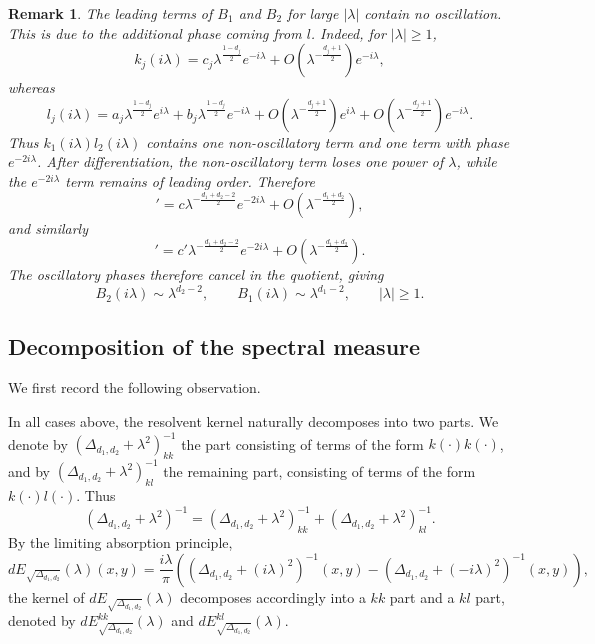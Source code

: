 \documentclass[12pt]{amsart}
\newcommand\Lapd{\Delta_{d_1, d_2}}
\newtheorem{remark}[theorem]{Remark}
\begin{document}
\begin{remark}
The leading terms of $B_1$ and $B_2$ for large $|\lambda|$ contain no
oscillation. This is due to the additional phase coming from $l$. Indeed, for
$|\lambda|\ge 1$,
\begin{equation*}
k_j(i\lambda)
=
c_j\lambda^{\frac{1-d_j}{2}}e^{-i\lambda}
+O\left(\lambda^{-\frac{d_j+1}{2}}\right)e^{-i\lambda},
\end{equation*}
whereas
\begin{equation*}
l_j(i\lambda)
=
a_j\lambda^{\frac{1-d_j}{2}}e^{i\lambda}
+b_j\lambda^{\frac{1-d_j}{2}}e^{-i\lambda}
+O\left(\lambda^{-\frac{d_j+1}{2}}\right)e^{i\lambda}
+O\left(\lambda^{-\frac{d_j+1}{2}}\right)e^{-i\lambda}.
\end{equation*}
Thus $k_1(i\lambda)l_2(i\lambda)$ contains one non-oscillatory term and one
term with phase $e^{-2i\lambda}$. After differentiation, the non-oscillatory
term loses one power of $\lambda$, while the $e^{-2i\lambda}$ term remains of
leading order. Therefore
\begin{equation*}
[k_1(i\lambda)l_2(i\lambda)]'
=
c\lambda^{-\frac{d_1+d_2-2}{2}}e^{-2i\lambda}
+O\left(\lambda^{-\frac{d_1+d_2}{2}}\right),
\end{equation*}
and similarly
\begin{equation*}
[k_1(i\lambda)k_2(i\lambda)]'
=
c'\lambda^{-\frac{d_1+d_2-2}{2}}e^{-2i\lambda}
+O\left(\lambda^{-\frac{d_1+d_2}{2}}\right).
\end{equation*}
The oscillatory phases therefore cancel in the quotient, giving
\begin{equation*}
B_2(i\lambda)\sim \lambda^{d_2-2},
\qquad
B_1(i\lambda)\sim \lambda^{d_1-2},
\qquad |\lambda|\ge 1.
\end{equation*}
\end{remark}

\subsection{Decomposition of the spectral measure}\label{ssec2.5}

We first record the following observation.

In all cases above, the resolvent kernel naturally decomposes into two parts.
We denote by $(\Lapd+\lambda^2)^{-1}_{kk}$ the part consisting of terms of the
form $k(\cdot)k(\cdot)$, and by $(\Lapd+\lambda^2)^{-1}_{kl}$ the remaining
part, consisting of terms of the form $k(\cdot)l(\cdot)$. Thus
\begin{equation*}
(\Lapd+\lambda^2)^{-1}
=
(\Lapd+\lambda^2)^{-1}_{kk}
+
(\Lapd+\lambda^2)^{-1}_{kl}.
\end{equation*}
By the limiting absorption principle,
\begin{equation*}
dE_{\sqrt{\Lapd}}(\lambda)(x,y)
=
\frac{i\lambda}{\pi}
\left(
\left(\Lapd+(i\lambda)^2\right)^{-1}(x,y)
-
\left(\Lapd+(-i\lambda)^2\right)^{-1}(x,y)
\right),
\end{equation*}
the kernel of $dE_{\sqrt{\Lapd}}(\lambda)$ decomposes accordingly into a
$kk$ part and a $kl$ part, denoted by
$dE_{\sqrt{\Lapd}}^{kk}(\lambda)$ and
$dE_{\sqrt{\Lapd}}^{kl}(\lambda)$.
\end{document}
